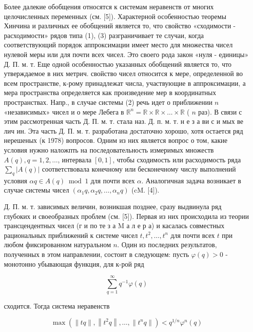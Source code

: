 \documentclass[10pt]{article}
\begin{document}
Более далекие обобщения относятся к системам неравенств от многих целочисленных переменных (см. [5]). Характерной особенностью теоремы Хинчина и различных ее обобщений является то, что свойство «сходимости - расходимости» рядов типа (1), (3) разграничивает те случаи, когда соответствующий порядок аппроксимации имеет место для множества чисел нулевой меры или для почти всех чисел. Это своего рода закон «нуля - единицы» Д. П. м. т. Еще одной особенностью указанных обобщений является то, что утверждаемое в них метрич. свойство чисел относится к мере, определенной во всем пространстве, к-рому принадлежат числа, участвующие в аппроксимации, а мера пространства определяется как произведение мер в координатных пространствах. Напр., в случае системы (2) речь идет о приближении $n$ «независимых» чисел и о мере Лебега в $\mathbb{R}^{n}=\mathbb{R} \times \mathbb{R} \times \ldots \times \mathbb{R}$ ( $n$ раз). В связи с этим рассмотренная часть Д. П. м. т. стала наз. Д. п. м. т. н е з а ви с и мых ве лич ин. Эта часть Д. П. м. т. разработана достаточно хорошо, хотя остается ряд нерешеных (к 1978) вопросов. Одним из них является вопрос о том, какие условия нужно наложпть на последовательность измеримых множеств $A(q), q=1,2, \ldots$, интервала $[0,1]$, чтобы сходимость или расходимость ряда $\sum_{q}|A(q)|$ соответствовала конечному или бесконечному числу выполнений условия $\alpha q \in A(q) \bmod 1$ для почти всех $\alpha$. Аналогичная задача возникает в случае системы чисел $\left(\alpha_{1} q, \alpha_{2} q, \ldots, \alpha_{n} q\right)$ (cM. [4]).



Д. П. м. т. зависимых величин, возникшая позднее, сразу выдвинула ряд глубоких и своеобразных проблем (см. [5]). Первая из них происходила из теории трансцендентных чисел (г и по те з а M а л е р а) и касалась совместных рациональных приближений к системе чисел $t, t^{2}, \ldots, t^{n}$ для почти всех $t$ при любом фиксированном натуральном $n$. Один из последних результатов, полученных в этом направлении, состоит в следующем: пусть $\varphi(q)>0$ - монотонно убывающая функция, для к-рой ряд



\[

\sum_{q=1}^{\infty} q^{-1} \varphi(q)

\]



сходится. Тогда система неравенств



\[

\max \left(\|t q\|,\left\|t^{2} q\right\|, \ldots,\left\|t^{n} q\right\|\right)<q^{1 / n} \varphi^{n}(q)

\]
\end{document}
